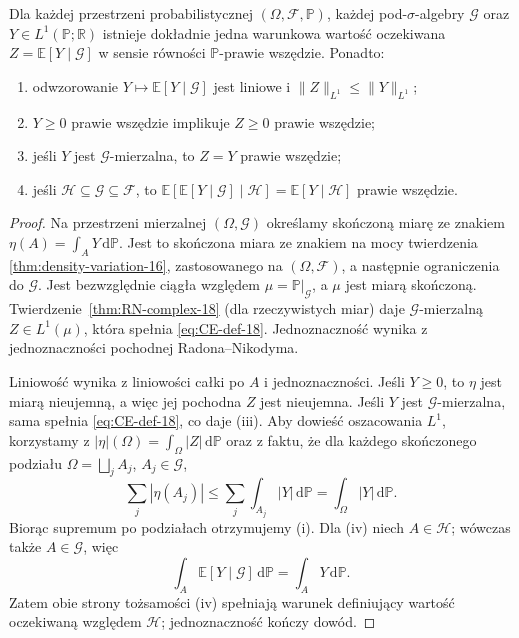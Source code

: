 \begin{twierdzenie}
\label{thm:CE-existence-18}
Dla każdej przestrzeni probabilistycznej
$(\Omega,\mathcal F,\mathbb P)$, każdej
pod-$\sigma$-algebry $\mathcal G$ oraz $Y\in L^1(\mathbb P;\mathbb R)$
istnieje dokładnie jedna warunkowa wartość oczekiwana
$Z=\mathbb E[Y\mid\mathcal G]$ w sensie równości
$\mathbb P$-prawie wszędzie. Ponadto:
\begin{enumerate}[label=\textup{(\roman*)}]
\item odwzorowanie $Y\mapsto\mathbb E[Y\mid\mathcal G]$
jest liniowe i $\|Z\|_{L^1}\le\|Y\|_{L^1}$;
\item $Y\ge0$ prawie wszędzie implikuje $Z\ge0$
prawie wszędzie;
\item jeśli $Y$ jest $\mathcal G$-mierzalna,
to $Z=Y$ prawie wszędzie;
\item jeśli $\mathcal H\subseteq\mathcal G\subseteq\mathcal F$,
to $\mathbb E[\mathbb E[Y\mid\mathcal G]\mid\mathcal H]
=\mathbb E[Y\mid\mathcal H]$ prawie wszędzie.
\end{enumerate}
\end{twierdzenie}
\begin{proof}
Na przestrzeni mierzalnej $(\Omega,\mathcal G)$
określamy skończoną miarę ze znakiem
$\eta(A)=\int_A Y\,\mathrm d\mathbb P$.
Jest to skończona miara ze znakiem na mocy twierdzenia
\ref{thm:density-variation-16}, zastosowanego na $(\Omega,\mathcal F)$,
a następnie ograniczenia do $\mathcal G$. Jest bezwzględnie
ciągła względem $\mu=\mathbb P|_{\mathcal G}$, a $\mu$ jest miarą
skończoną. Twierdzenie~\ref{thm:RN-complex-18}
(dla rzeczywistych miar) daje $\mathcal G$-mierzalną
$Z\in L^1(\mu)$, która spełnia
\eqref{eq:CE-def-18}. Jednoznaczność wynika z
jednoznaczności pochodnej Radona--Nikodyma.

Liniowość wynika z liniowości całki po $A$ i
jednoznaczności. Jeśli $Y\ge0$, to $\eta$ jest
miarą nieujemną, a więc jej pochodna $Z$ jest
nieujemna. Jeśli $Y$ jest $\mathcal G$-mierzalna,
sama spełnia \eqref{eq:CE-def-18}, co daje (iii).
Aby dowieść oszacowania $L^1$, korzystamy z
$|\eta|(\Omega)=\int_\Omega|Z|\,\mathrm d\mathbb P$
oraz z faktu, że dla każdego skończonego podziału
$\Omega=\bigsqcup_jA_j$, $A_j\in\mathcal G$,
\[
\sum_j|\eta(A_j)|
\le\sum_j\int_{A_j}|Y|\,\mathrm d\mathbb P
=\int_\Omega|Y|\,\mathrm d\mathbb P.
\]
Biorąc supremum po podziałach otrzymujemy (i).
Dla (iv) niech $A\in\mathcal H$; wówczas także
$A\in\mathcal G$, więc
\[
\int_A\mathbb E[Y\mid\mathcal G] \,\mathrm d\mathbb P
=\int_A Y\,\mathrm d\mathbb P.
\]
Zatem obie strony tożsamości (iv) spełniają
warunek definiujący wartość oczekiwaną względem
$\mathcal H$; jednoznaczność kończy dowód.
\end{proof}

